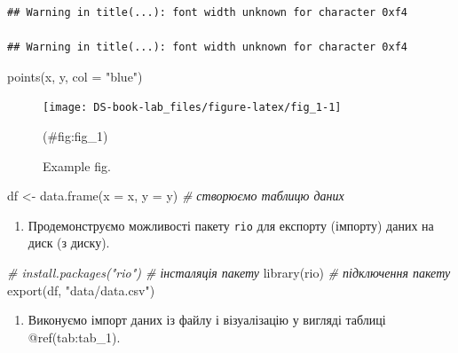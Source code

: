 \documentclass[
]{book}
\newenvironment{Shaded}{\begin{snugshade}}{\end{snugshade}}
\newcommand{\AttributeTok}[1]{\textcolor[rgb]{0.77,0.63,0.00}{#1}}
\newcommand{\CommentTok}[1]{\textcolor[rgb]{0.56,0.35,0.01}{\textit{#1}}}
\newcommand{\FunctionTok}[1]{\textcolor[rgb]{0.00,0.00,0.00}{#1}}
\newcommand{\NormalTok}[1]{#1}
\newcommand{\OtherTok}[1]{\textcolor[rgb]{0.56,0.35,0.01}{#1}}
\newcommand{\StringTok}[1]{\textcolor[rgb]{0.31,0.60,0.02}{#1}}
\providecommand{\tightlist}{%
  \setlength{\itemsep}{0pt}\setlength{\parskip}{0pt}}
\begin{document}
\begin{verbatim}
## Warning in title(...): font width unknown for character 0xf4

## Warning in title(...): font width unknown for character 0xf4
\end{verbatim}

\begin{Shaded}
\begin{Highlighting}[]
\FunctionTok{points}\NormalTok{(x, y,}
       \AttributeTok{col =} \StringTok{"blue"}\NormalTok{)}
\end{Highlighting}
\end{Shaded}

\begin{figure}

{\centering \texttt{[image: DS-book-lab\_files/figure-latex/fig\_1-1]} 

}

\caption{Example fig.}(\#fig:fig_1)
\end{figure}

\begin{Shaded}
\begin{Highlighting}[]
\NormalTok{df }\OtherTok{\textless{}{-}} \FunctionTok{data.frame}\NormalTok{(}\AttributeTok{x =}\NormalTok{ x, }\AttributeTok{y =}\NormalTok{ y) }\CommentTok{\# створюємо таблицю даних}
\end{Highlighting}
\end{Shaded}

\begin{enumerate}
\def\labelenumi{\arabic{enumi}.}
\setcounter{enumi}{3}
\tightlist
\item
  Продемонструємо можливості пакету \texttt{rio} \citep{R-rio} для експорту (імпорту) даних на диск (з диску).
\end{enumerate}

\begin{Shaded}
\begin{Highlighting}[]
\CommentTok{\# install.packages("rio") \# інсталяція пакету}
\FunctionTok{library}\NormalTok{(rio) }\CommentTok{\# підключення пакету}
\FunctionTok{export}\NormalTok{(df, }\StringTok{"data/data.csv"}\NormalTok{)}
\end{Highlighting}
\end{Shaded}

\begin{enumerate}
\def\labelenumi{\arabic{enumi}.}
\setcounter{enumi}{4}
\tightlist
\item
  Виконуємо імпорт даних із файлу і візуалізацію у вигляді таблиці @ref(tab:tab\_1).
\end{enumerate}
\end{document}

